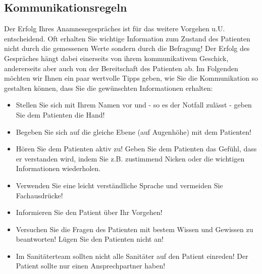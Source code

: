 \subsection{Kommunikationsregeln}
Der Erfolg Ihres Anamnesegespräches ist für das weitere Vorgehen u.U. entscheidend. Oft erhalten Sie wichtige Information zum Zustand des Patienten nicht durch die gemessenen Werte sondern durch die Befragung! Der Erfolg des Gespräches hängt dabei einerseits von ihrem kommunikativem Geschick, andererseits aber auch von der Bereitschaft des Patienten ab. Im Folgenden möchten wir Ihnen ein paar wertvolle Tipps geben, wie Sie die Kommunikation so gestalten können, dass Sie die gewünschten Informationen erhalten:
\begin{itemize}
\item Stellen Sie sich mit Ihrem Namen vor und - so es der Notfall zulässt - geben Sie dem Patienten die Hand!
\item Begeben Sie sich auf die gleiche Ebene (auf Augenhöhe) mit dem Patienten!
\item Hören Sie dem Patienten aktiv zu! Geben Sie dem Patienten das Gefühl, dass er verstanden wird, indem Sie z.B. zustimmend Nicken oder die wichtigen Informationen wiederholen.
\item Verwenden Sie eine leicht verständliche Sprache und vermeiden Sie Fachausdrücke!
\item Informieren Sie den Patient über Ihr Vorgehen!
\item Versuchen Sie die Fragen des Patienten mit bestem Wissen und Gewissen zu beantworten! Lügen Sie den Patienten nicht an!
\item Im Sanitäterteam sollten nicht alle Sanitäter auf den Patient einreden! Der Patient sollte nur einen Ansprechpartner haben!
\end{itemize}


